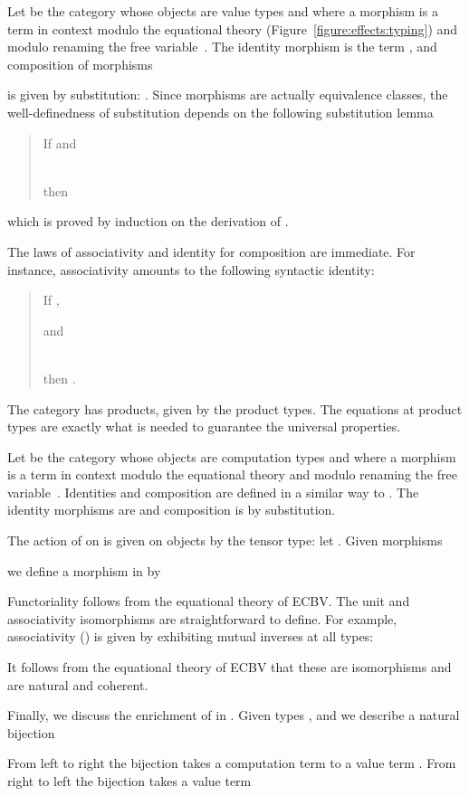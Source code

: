 \documentclass{LMCS}
\let\then\relax
\begin{document}
Let  be the category whose objects are value types 
and where a morphism  is a term in context
 modulo the equational theory (Figure~\ref{figure:effects:typing}) and modulo renaming the free variable~.
The identity morphism
is the term ,
and composition of morphisms

is given by substitution: .
Since morphisms are actually equivalence classes, the 
well-definedness of substitution depends on the following 
substitution lemma
\begin{quote}
If  and
 
\\then 
\end{quote}
which is proved by induction on the derivation of 
. 

The laws of associativity and identity for composition 
are immediate. For instance, associativity 
amounts to the following syntactic identity:
\begin{quote}
If , \quad
 
and
 
\\then \text.
\end{quote}

The category  has products, given by the product types.
The equations at product types
are exactly what is needed to guarantee the universal
properties.

Let  be the category whose objects are computation types
and where a morphism  is a term in context
 modulo the equational theory
and modulo renaming the free variable~.
Identities and composition are defined in a similar way to .
The identity morphisms  are  
and composition is by substitution.

The action of  on  is given on objects by the tensor type: 
let .
Given morphisms 

we define a morphism 
in  by

Functoriality follows from the equational theory of ECBV.
The unit and associativity isomorphisms are straightforward to define.
For example, associativity () is given by exhibiting
 mutual inverses at all types:

It follows from the 
equational theory of ECBV that these are isomorphisms and are natural and 
coherent.

Finally, we discuss the enrichment of  in .
Given types ,  and  we describe a natural bijection

From left to right the bijection takes a 
computation term 
to a value term 
.
From right to left the bijection takes a 
value term
\end{document}
